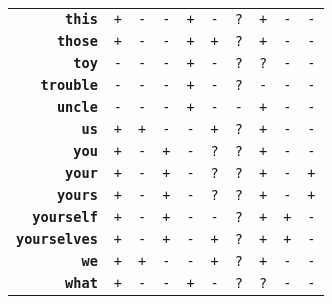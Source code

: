 \documentclass{article}
\begin{document}
\begin{minipage}{\textwidth}
{\begin{tabular}{|r|c|c|c|c|c|c|c|c|c|}
    \textbf{\texttt{this}} & \texttt{+}
    & \texttt{-} & \texttt{-}
    & \texttt{+} & \texttt{-}
    & \texttt{?} & \texttt{+}
    & \texttt{-} & \texttt{-} \\
    \textbf{\texttt{those}} & \texttt{+}
    & \texttt{-} & \texttt{-}
    & \texttt{+} & \texttt{+}
    & \texttt{?} & \texttt{+}
    & \texttt{-} & \texttt{-} \\
    \textbf{\texttt{toy}} & \texttt{-}
    & \texttt{-} & \texttt{-}
    & \texttt{+} & \texttt{-}
    & \texttt{?} & \texttt{?}
    & \texttt{-} & \texttt{-} \\
    \textbf{\texttt{trouble}} & \texttt{-}
    & \texttt{-} & \texttt{-}
    & \texttt{+} & \texttt{-}
    & \texttt{?} & \texttt{-}
    & \texttt{-} & \texttt{-} \\
    \textbf{\texttt{uncle}} & \texttt{-}
    & \texttt{-} & \texttt{-}
    & \texttt{+} & \texttt{-}
    & \texttt{-} & \texttt{+}
    & \texttt{-} & \texttt{-} \\
    \textbf{\texttt{us}} & \texttt{+}
    & \texttt{+} & \texttt{-}
    & \texttt{-} & \texttt{+}
    & \texttt{?} & \texttt{+}
    & \texttt{-} & \texttt{-} \\
    \textbf{\texttt{you}} & \texttt{+}
    & \texttt{-} & \texttt{+}
    & \texttt{-} & \texttt{?}
    & \texttt{?} & \texttt{+}
    & \texttt{-} & \texttt{-} \\
    \textbf{\texttt{your}} & \texttt{+}
    & \texttt{-} & \texttt{+}
    & \texttt{-} & \texttt{?}
    & \texttt{?} & \texttt{+}
    & \texttt{-} & \texttt{+} \\
    \textbf{\texttt{yours}} & \texttt{+}
    & \texttt{-} & \texttt{+}
    & \texttt{-} & \texttt{?}
    & \texttt{?} & \texttt{+}
    & \texttt{-} & \texttt{+} \\
    \textbf{\texttt{yourself}} & \texttt{+}
    & \texttt{-} & \texttt{+}
    & \texttt{-} & \texttt{-}
    & \texttt{?} & \texttt{+}
    & \texttt{+} & \texttt{-} \\
    \textbf{\texttt{yourselves}} & \texttt{+}
    & \texttt{-} & \texttt{+}
    & \texttt{-} & \texttt{+}
    & \texttt{?} & \texttt{+}
    & \texttt{+} & \texttt{-} \\
    \textbf{\texttt{we}} & \texttt{+}
    & \texttt{+} & \texttt{-}
    & \texttt{-} & \texttt{+}
    & \texttt{?} & \texttt{+}
    & \texttt{-} & \texttt{-} \\
    \textbf{\texttt{what}} & \texttt{+}
    & \texttt{-} & \texttt{-}
    & \texttt{+} & \texttt{-}
    & \texttt{?} & \texttt{?}
    & \texttt{-} & \texttt{-} \\

\end{tabular}}
\end{minipage}
\end{document}
